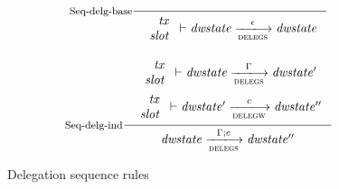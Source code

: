 \begin{figure}
  \begin{equation}
    \inference[Seq-delg-base]
    {}
    {
      \begin{array}{r}
        \var{tx}\\
        \var{slot}
      \end{array}
      \vdash
      \var{dwstate}
      \trans{delegs}{\epsilon}
      \var{dwstate}
    }
    \label{eq:rule:sequence-delegation-base}
  \end{equation}

  \begin{equation}
    \inference[Seq-delg-ind]
    {
      {
        \begin{array}{r}
          \var{tx}\\
          \var{slot}\\
        \end{array}
      }
      \vdash
      \var{dwstate}
      \trans{delegs}{\Gamma}
      \var{dwstate'}
    \\ ~ \\
    {
      \begin{array}{r}
        \var{tx}\\
        \var{slot}\\
      \end{array}
    }
    \vdash
      \var{dwstate'}
      \trans{delegw}{c}
      \var{dwstate''}
    }
    {
      \var{dwstate}
      \trans{delegs}{\Gamma; c}
      \var{dwstate''}
    }
    \label{eq:rule:sequence-delegation-inductive}
  \end{equation}
  \caption{Delegation sequence rules}
  \label{fig:rules:delegation-sequence}
\end{figure}
